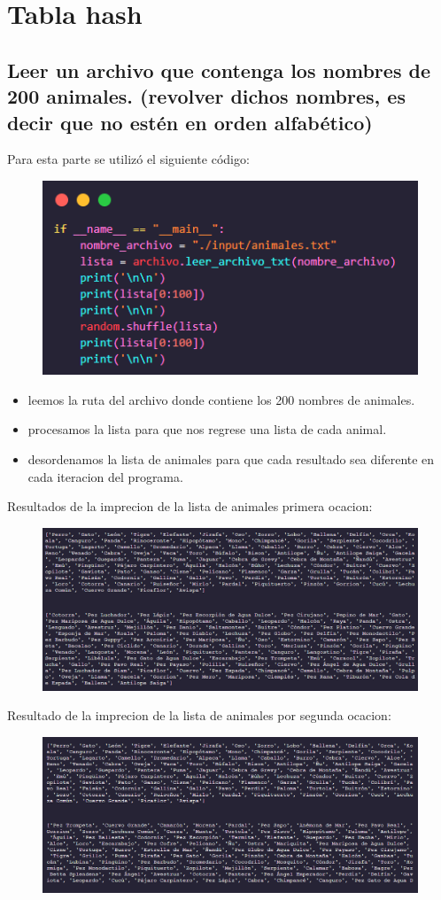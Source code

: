 \section{Tabla hash}

\subsection{Leer un archivo que contenga los nombres de 200 animales. (revolver dichos nombres, es decir que no estén en orden alfabético)}
Para esta parte se utilizó el siguiente código:
\begin{figure}[ht]
  \centering
  \includegraphics[width=0.7\linewidth]{./src/img/hash/codigo.png}
\end{figure}
\begin{itemize}
  \item leemos la ruta del archivo donde contiene los 200 nombres de animales.
  \item procesamos la lista para que nos regrese una lista de cada animal.
  \item desordenamos la lista de animales para que cada resultado sea diferente en cada iteracion del programa.
\end{itemize}

Resultados de la imprecion de la lista de animales primera ocacion:
\begin{figure}[ht]
  \centering
  \includegraphics[width=0.7\linewidth]{./src/img/hash/image1.png}
\end{figure}

Resultado de la imprecion de la lista de animales por segunda ocacion:
\begin{figure}[ht]
  \centering
  \includegraphics[width=0.7\linewidth]{./src/img/hash/image2.png}
\end{figure}

